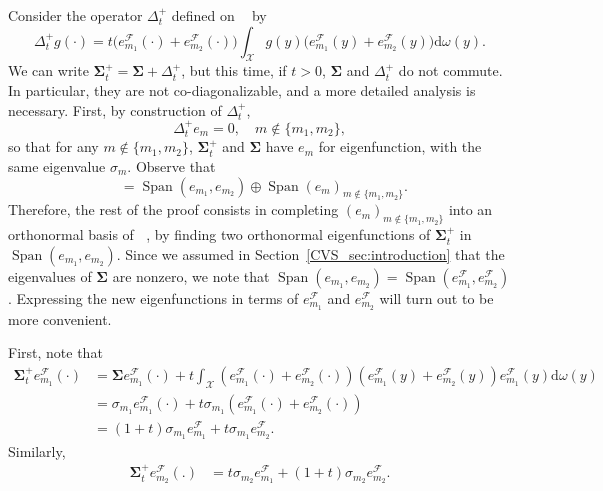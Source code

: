 \documentclass[twoside,11pt]{book}
\numberwithin{theorem}{chapter}
\numberwithin{definition}{chapter}
\numberwithin{proposition}{chapter}
\numberwithin{corollary}{chapter}
\numberwithin{example}{chapter}
\numberwithin{lemma}{chapter}
\numberwithin{assumption}{chapter}
\DeclareMathOperator{\Span}{\mathrm{Span}}
\DeclareMathOperator{\F}{\mathcal{F}}
\DeclareMathOperator{\X}{\mathcal{X}}
\DeclareMathOperator{\Ltwo}{\mathbb{L}_{2}(\mathrm{d} \omega)}
\begin{document}
Consider the operator $\Delta_{t}^{+}$ defined on $\Ltwo$ by
\begin{equation}
\Delta_{t}^{+}g(\cdot) = t \bigg(e_{m_{1}}^{\F}(\cdot)+e_{m_{2}}^{\F}(\cdot) \bigg) \int_{\X} g(y) \bigg(e_{m_{1}}^{\F}(y)+e_{m_{2}}^{\F}(y) \bigg) \mathrm{d}\omega(y).
\end{equation}
We can write $\bm{\Sigma}_{t}^{+} = \bm{\Sigma} + \Delta_{t}^{+}$, but this time, if $t>0$, $\bm{\Sigma}$ and $\Delta_{t}^{+}$ do not commute. In particular, they are not co-diagonalizable, and a more detailed analysis is necessary. First, by construction of $\Delta_{t}^{+}$,
$$
\Delta_{t}^{+} e_m = 0, \quad m\notin\{m_1,m_2\},
$$
so that for any $m\notin\{m_1,m_2\}$, $\bm{\Sigma}_{t}^{+}$ and $\bm{\Sigma}$ have $e_m$ for eigenfunction, with the same eigenvalue $\sigma_m$. Observe that
\begin{equation}
\Ltwo = \Span (e_{m_1},e_{m_2}) \oplus \Span (e_{m})_{m \notin \{m_1,m_2\}}.
\end{equation}
Therefore, the rest of the proof consists in completing $(e_m)_{m\notin\{m_1,m_2\}}$ into an orthonormal basis of $\Ltwo$, by finding two orthonormal eigenfunctions of $\bm{\Sigma}_{t}^{+}$ in $\Span (e_{m_{1}},e_{m_{2}})$.
Since we assumed in Section~\ref{CVS_sec:introduction} that the eigenvalues of $\bm{\Sigma}$ are nonzero, we note that $\Span (e_{m_{1}},e_{m_{2}}) = \Span (e_{m_{1}}^{\F},e_{m_{2}}^{\F})$. Expressing the new eigenfunctions in terms of $e_{m_{1}}^{\F}$ and $e_{m_{2}}^{\F}$ will turn out to be more convenient.

First, note that 
\begin{align}
\bm{\Sigma}_{t}^{+}e_{m_{1}}^{\mathcal{F}}(\cdot) & = \bm{\Sigma} e_{m_{1}}^{\mathcal{F}}(\cdot) + t \int_{\mathcal{X}} \left(e_{m_{1}}^{\mathcal{F}}(\cdot) + e_{m_{2}}^{\mathcal{F}}(\cdot) \right)\left( e_{m_{1}}^{\mathcal{F}}(y) + e_{m_{2}}^{\mathcal{F}}(y) \right) e_{m_{1}}^{\mathcal{F}}(y) \mathrm{d}\omega(y) \\
& = \sigma_{m_{1}} e_{m_{1}}^{\mathcal{F}}(\cdot) + t \sigma_{m_{1}} \left(e_{m_{1}}^{\mathcal{F}}(\cdot) + e_{m_{2}}^{\mathcal{F}}(\cdot) \right)\\
& = (1+t) \sigma_{m_{1}}e_{m_{1}}^{\mathcal{F}} + t \sigma_{m_{1}} e_{m_{2}}^{\mathcal{F}}.\label{CVS_eq:sigma_t_plus_action}
\end{align}
Similarly,
\begin{align}
\bm{\Sigma}_{t}^{+}e_{m_{2}}^{\mathcal{F}}(.) & = t \sigma_{m_{2}} e_{m_{1}}^{\mathcal{F}} + (1+t) \sigma_{m_{2}}e_{m_{2}}^{\mathcal{F}}.\label{CVS_eq:sigma_t_plus_action_2}
\end{align}
\end{document}

